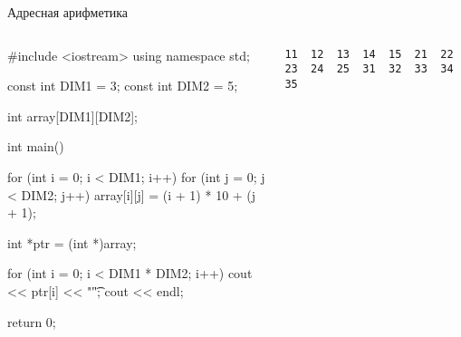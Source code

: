 \documentclass[
    9pt,
    hyperref={pdfencoding=unicode}
    ]{beamer}
\theoremstyle{definition}
\begin{document}
\begin{frame}[fragile]{Адресная арифметика}
    \footnotesize
    \begin{columns}
        \begin{column}{0.7\textwidth}
            \begin{cppcode}
                #include <iostream>        
                using namespace std;   
                
                const int DIM1 = 3;
                const int DIM2 = 5;
                
                int array[DIM1][DIM2];
                
                int main() {            
                    for (int i = 0; i < DIM1; i++) {
                        for (int j = 0; j < DIM2; j++) {
                            array[i][j] = (i + 1) * 10 + (j + 1);
                        }
                    }
                    
                    int *ptr = (int *)array;
                    
                    for (int i = 0; i < DIM1 * DIM2; i++) {
                        cout << ptr[i] << "\t";
                    }
                    cout << endl;
                    
                    return 0;
                }
            \end{cppcode}
        \end{column}
        \begin{column}{0.3\textwidth}
            \begin{verbatim}
11  12  13  14  15  21  22  23  24  25  31  32  33  34  35
            \end{verbatim}
        \end{column}
    \end{columns}
    
\end{frame}
\end{document}
